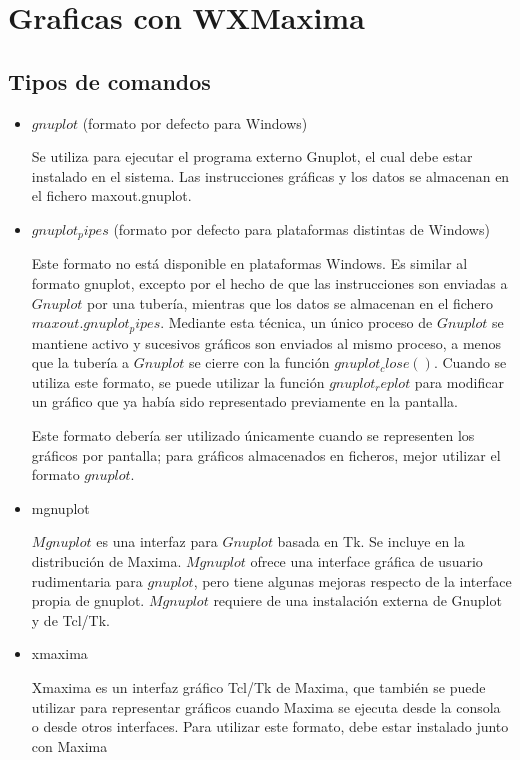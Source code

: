 \documentclass[10pt,a4paper]{book}
\begin{document}
\chapter{Graficas con WXMaxima}
\section{Tipos de comandos}
\begin{small}

\begin{itemize}
\item $gnuplot$ (formato por defecto para Windows)

Se utiliza para ejecutar el programa externo Gnuplot, el cual debe estar instalado en el sistema. Las instrucciones gráficas y los datos se almacenan en el fichero maxout.gnuplot.

\item $gnuplot_pipes$ (formato por defecto para plataformas distintas de Windows)

Este formato no está disponible en plataformas Windows. Es similar al formato gnuplot, excepto por el hecho de que las instrucciones son enviadas a $Gnuplot$ por una tubería, mientras que los datos se almacenan en el fichero $maxout.gnuplot_pipes$. 
Mediante esta técnica, un único proceso de $Gnuplot$ se mantiene activo y sucesivos gráficos son enviados al mismo proceso, a menos que la tubería a $Gnuplot$ se cierre con la función $gnuplot_close()$. Cuando se utiliza este formato, se puede utilizar la función $gnuplot_replot$ para modificar un gráfico que ya había sido representado previamente en la pantalla.

Este formato debería ser utilizado únicamente cuando se representen los gráficos por pantalla; para gráficos almacenados en ficheros, mejor utilizar el formato $gnuplot$.

\item mgnuplot

$Mgnuplot$ es una interfaz para $Gnuplot$ basada en Tk. Se incluye en la distribución de Maxima. $Mgnuplot$ ofrece una interface gráfica de usuario rudimentaria para $gnuplot$, pero tiene algunas mejoras respecto de la interface propia de gnuplot. $Mgnuplot$ requiere de una instalación externa de Gnuplot y de Tcl/Tk.

\item xmaxima

Xmaxima es un interfaz gráfico Tcl/Tk de Maxima, que también se puede utilizar para representar gráficos cuando Maxima se ejecuta desde la consola o desde otros interfaces. Para utilizar este formato, debe estar instalado junto con Maxima
\end{itemize}


\end{small}
\end{document}
